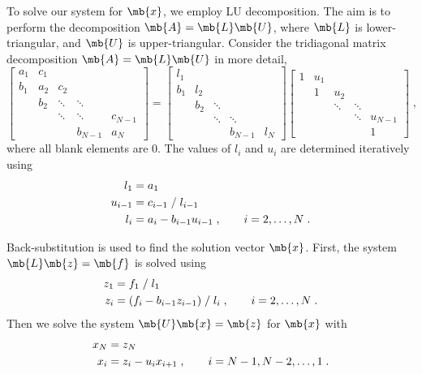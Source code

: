\documentclass[11pt]{article}
\begin{document}
To solve our system for $\mb{x}$, we employ LU decomposition. The aim is to perform the decomposition $\mb{A} = \mb{L} \mb{U}$, where $\mb{L}$ is lower-triangular, and $\mb{U}$ is upper-triangular. Consider the tridiagonal matrix decomposition $\mb{A} = \mb{L} \mb{U}$ in more detail,
\begin{equation}
\begin{bmatrix}
a_1 & c_1 &        &         & \\
b_1 & a_2 & c_2    &         & \\
    & b_2 & \ddots & \ddots  & \\
    &     & \ddots & \ddots  & c_{N-1} \\
    &     &        & b_{N-1} & a_N
\end{bmatrix}
=
\begin{bmatrix}
l_1 &     &        &         & \\
b_1 & l_2 &        &         & \\
    & b_2 & \ddots &         & \\
    &     & \ddots & \ddots  & \\
    &     &        & b_{N-1} & l_N
\end{bmatrix}
\begin{bmatrix}
1 & u_1 &        &        & \\
  & 1   & u_2    &        & \\
  &     & \ddots & \ddots & \\
  &     &        & \ddots & u_{N-1} \\
  &     &        &        & 1
\end{bmatrix}
\;,
\end{equation}
where all blank elements are 0. The values of $l_i$ and $u_i$ are determined iteratively using
\begin{align}
l_1     &= a_1 \notag \\
u_{i-1} &= c_{i-1} \; / \; l_{i-1} \notag \\
l_i     &= a_i - b_{i-1} u_{i-1}
\;,
\qquad
i = 2, \dots, N
\;.
\end{align}

Back-substitution is used to find the solution vector $\mb{x}$. First, the system $\mb{L} \mb{z} = \mb{f}$ is solved using
\begin{align}
z_1 &= f_1 \; / \; l_1 \notag \\
z_i &= (f_i - b_{i-1} z_{i-1}) \; / \; l_i
\;,
\qquad
i = 2, \dots, N
\;.
\end{align}
Then we solve the system $\mb{U} \mb{x} = \mb{z}$ for $\mb{x}$ with
\begin{align}
x_N &= z_N \notag \\
x_i &= z_i - u_i x_{i+1}
\;,
\qquad
i = N-1, N-2, \dots, 1
\;.
\end{align}
\end{document}
